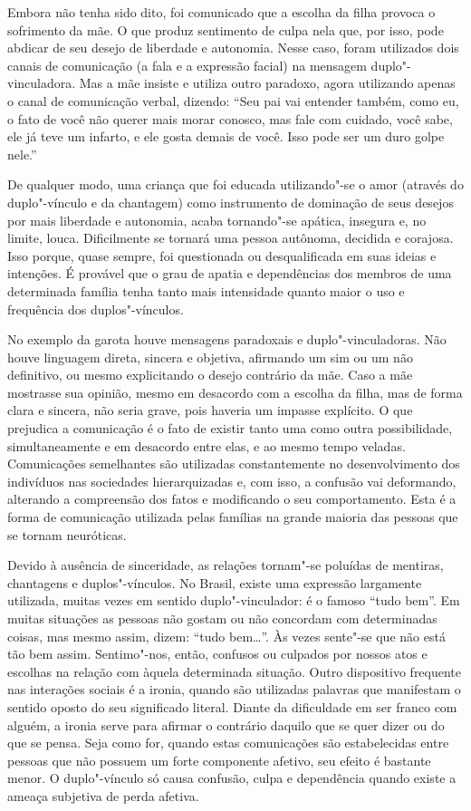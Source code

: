 Embora não tenha sido dito, foi comunicado que a escolha da filha
provoca o sofrimento da mãe. O que produz sentimento de culpa nela que,
por isso, pode abdicar de seu desejo de liberdade e autonomia. Nesse
caso, foram utilizados dois canais de comunicação (a fala e a expressão
facial) na mensagem duplo"-vinculadora. Mas a mãe insiste e utiliza outro
paradoxo, agora utilizando apenas o canal de comunicação verbal,
dizendo: ``Seu pai vai entender também, como eu, o fato de você não
querer mais morar conosco, mas fale com cuidado, você sabe, ele já teve
um infarto, e ele gosta demais de você. Isso pode ser um duro golpe
nele.''

De qualquer modo, uma criança que foi educada utilizando"-se o amor
(através do duplo"-vínculo e da chantagem) como instrumento de dominação
de seus desejos por mais liberdade e autonomia, acaba tornando"-se
apática, insegura e, no limite, louca. Dificilmente se tornará uma pessoa
autônoma, decidida e corajosa. Isso porque, quase sempre, foi
questionada ou desqualificada em suas ideias e intenções. É provável que
o grau de apatia e dependências dos membros de uma determinada família
tenha tanto mais intensidade quanto maior o uso e frequência dos duplos"-vínculos.

No exemplo da garota houve mensagens paradoxais e duplo"-vinculadoras.
Não houve linguagem direta, sincera e objetiva, afirmando um sim ou um
não definitivo, ou mesmo explicitando o desejo contrário da mãe. Caso a
mãe mostrasse sua opinião, mesmo em desacordo com a escolha da filha,
mas de forma clara e sincera, não seria grave, pois haveria um impasse
explícito. O que prejudica a comunicação é o fato de existir tanto uma
como outra possibilidade, simultaneamente e em desacordo entre elas, e
ao mesmo tempo veladas. Comunicações semelhantes são utilizadas
constantemente no desenvolvimento dos indivíduos nas sociedades
hierarquizadas e, com isso, a confusão vai deformando, alterando a
compreensão dos fatos e modificando o seu comportamento. Esta é a forma
de comunicação utilizada pelas famílias na grande maioria das pessoas
que se tornam neuróticas.

Devido à ausência de sinceridade, as relações tornam"-se poluídas de
mentiras, chantagens e duplos"-vínculos. No Brasil, existe uma expressão
largamente utilizada, muitas vezes em sentido duplo"-vinculador: é o
famoso ``tudo bem''. Em muitas situações as pessoas não gostam ou não
concordam com determinadas coisas, mas mesmo assim, dizem: ``tudo
bem\ldots{}''. Às vezes sente"-se que não está tão bem assim. Sentimo"-nos,
então, confusos ou culpados por nossos atos e escolhas na relação com
àquela determinada situação. Outro dispositivo frequente nas interações
sociais é a ironia, quando são utilizadas palavras que manifestam o
sentido oposto do seu significado literal. Diante da dificuldade em ser
franco com alguém, a ironia serve para afirmar o contrário daquilo que
se quer dizer ou do que se pensa. Seja como for, quando estas
comunicações são estabelecidas entre pessoas que não possuem um forte
componente afetivo, seu efeito é bastante menor. O duplo"-vínculo só
causa confusão, culpa e dependência quando existe a ameaça subjetiva de
perda afetiva.

